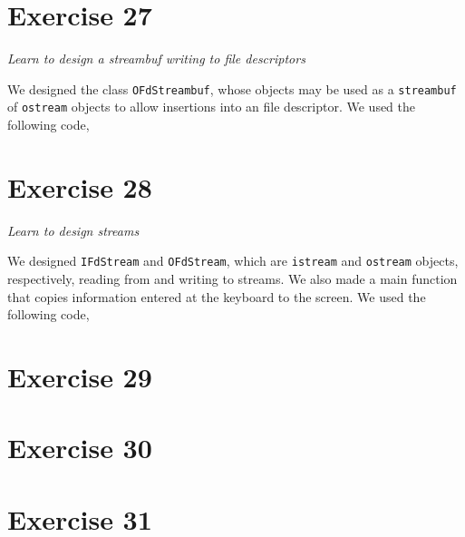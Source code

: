 \documentclass[12pt]{article}
\newcommand{\desc}[1]{\textit{#1} \vspace{1em}}
\begin{document}
\clearpage

\section*{Exercise 27}
\desc{Learn to design a streambuf writing to file descriptors}

We designed the class \texttt{OFdStreambuf}, whose objects may be used as a \texttt{streambuf} of \texttt{ostream} objects to allow insertions into an file descriptor. We used the following code,












\clearpage

\section*{Exercise 28}
\desc{Learn to design streams}

We designed \texttt{IFdStream} and \texttt{OFdStream}, which are \texttt{istream} and \texttt{ostream} objects, respectively, reading from and writing to streams. We also made a main function that copies information entered at the keyboard to the screen. We used the following code,












\clearpage

\section*{Exercise 29}
\desc{}

\clearpage

\section*{Exercise 30}
\desc{}

\clearpage

\section*{Exercise 31}
\desc{}

\clearpage
\end{document}
